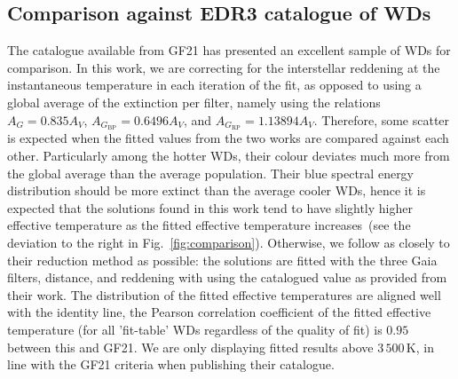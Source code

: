 \documentclass[fleqn,usenatbib]{rasti}
\begin{document}
\subsection{Comparison against EDR3 catalogue of WDs}

The catalogue available from GF21 has presented an excellent sample of WDs for
comparison. In this work, we are correcting for the interstellar reddening at
the instantaneous temperature in each iteration of the fit, as opposed to using
a global average of the extinction per filter, namely using the
relations $A_{G}=0.835A_{V}$, $A_{G_{\mathrm{BP}}}=0.6496A_{V}$, and
$A_{G_{\mathrm{RP}}}=1.13894A_{V}$. Therefore, some scatter is expected when
the fitted values from the two works are compared against each other.
Particularly among the hotter WDs, their colour deviates much more from the
global average than the average population. Their blue spectral energy
distribution should be more extinct than the average cooler WDs, hence it is
expected that the solutions found in this work tend to have slightly higher
effective temperature as the fitted effective temperature
increases~(see the deviation to the right in Fig.~\ref{fig:comparison}).
Otherwise, we follow as closely to their reduction method as
possible: the solutions are fitted with the three Gaia filters, distance, and
reddening with using the catalogued value as provided from their work. The
distribution of the fitted effective temperatures are aligned well with the
identity line, the Pearson correlation coefficient of the fitted effective
temperature (for all 'fit-table' WDs regardless of the quality of fit) is
$0.95$ between this and GF21. We are only displaying fitted results above
$3\,500$\,K, in line with the GF21 criteria when publishing their catalogue.
\end{document}
